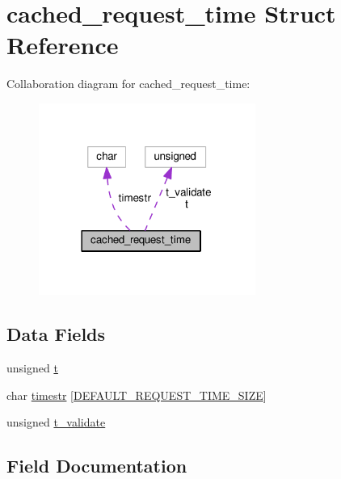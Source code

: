 \hypertarget{structcached__request__time}{}\section{cached\+\_\+request\+\_\+time Struct Reference}
\label{structcached__request__time}


Collaboration diagram for cached\+\_\+request\+\_\+time\+:
\nopagebreak
\begin{figure}[H]
\begin{center}
\leavevmode
\includegraphics[width=201pt]{structcached__request__time__coll__graph}
\end{center}
\end{figure}
\subsection*{Data Fields}
\begin{DoxyCompactItemize}
\item 
unsigned \hyperlink{structcached__request__time_a6ffb326f81d0128ff3cb9904636d185c}{t}
\item 
char \hyperlink{structcached__request__time_a6a2659c8059f54f7dfc33cbf41a31e8f}{timestr} \mbox{[}\hyperlink{mod__log__config_8c_a9e408c17712b6d82eca277f5d2b295f4}{D\+E\+F\+A\+U\+L\+T\+\_\+\+R\+E\+Q\+U\+E\+S\+T\+\_\+\+T\+I\+M\+E\+\_\+\+S\+I\+ZE}\mbox{]}
\item 
unsigned \hyperlink{structcached__request__time_ace37638601f7033c4f1e3833553dd443}{t\+\_\+validate}
\end{DoxyCompactItemize}


\subsection{Field Documentation}
